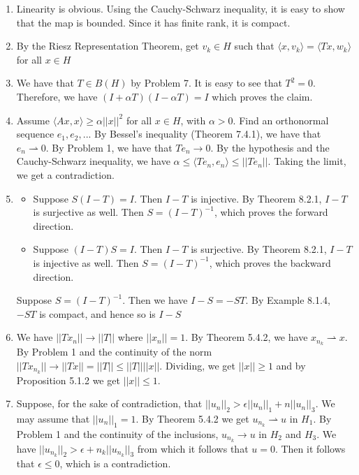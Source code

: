\documentclass{article}
\begin{document}
\begin{enumerate}
    \item Linearity is obvious. Using the Cauchy-Schwarz inequality, it is easy to show that the map is bounded. Since it has finite rank, it is compact.
    
    \item By the Riesz Representation Theorem, get $v_k \in H$ such that $\langle x,v_k \rangle = \langle Tx, w_k \rangle$ for all $x \in H$
    
    \item We have that $T \in B(H)$ by Problem 7. It is easy to see that $T^2=0$. Therefore, we have $(I+\alpha T)(I - \alpha T)=I$ which proves the claim.
    
    \item Assume $\langle Ax,x \rangle \geq \alpha ||x||^2$ for all $x \in H$, with $\alpha>0$. Find an orthonormal sequence $e_1,e_2,..$. By Bessel's inequality (Theorem 7.4.1), we have that $e_n \rightharpoonup 0$. By Problem 1, we have that $Te_n \to 0$. By the hypothesis and the Cauchy-Schwarz inequality, we have $\alpha \leq \langle Te_n,e_n \rangle  \leq ||Te_n||$. Taking the limit, we get a contradiction.
    
    \item 
    
    \begin{itemize}
        \item Suppose $S(I-T)=I$. Then $I-T$ is injective. By Theorem 8.2.1, $I-T$ is surjective as well. Then $S=(I-T)^{-1}$, which proves the forward direction.

        \item Suppose $(I-T)S=I$. Then $I-T$ is surjective. By Theorem 8.2.1, $I-T$ is injective as well. Then $S=(I-T)^{-1}$, which proves the backward direction.
    \end{itemize}

    Suppose $S=(I-T)^{-1}$. Then we have $I-S=-ST$. By Example 8.1.4, $-ST$ is compact, and hence so is $I-S$
    
    \item We have $||Tx_n|| \to ||T||$ where $||x_n||=1$. By Theorem 5.4.2, we have $x_{n_k} \rightharpoonup x$. By Problem 1 and the continuity of the norm $||Tx_{n_k}|| \to ||Tx|| = ||T|| \leq ||T|| ||x||$. Dividing, we get $||x|| \geq 1$ and by Proposition 5.1.2 we get $||x|| \leq 1$.
    
    \item Suppose, for the sake of contradiction, that $||u_n||_2> \epsilon ||u_n||_1+n||u_n||_3$. We may assume that $||u_n||_1=1$. By Theorem 5.4.2 we get $u_{n_k} \rightharpoonup u$ in $H_1$. By Problem 1 and the continuity of the inclusions, $u_{n_k} \to u$ in $H_2$ and $H_3$. We have $||u_{n_k}||_2 > \epsilon + n_k ||u_{n_k}||_3$ from which it follows that $u=0$. Then it follows that $\epsilon \leq 0$, which is a contradiction.
    

\end{enumerate}
\end{document}
